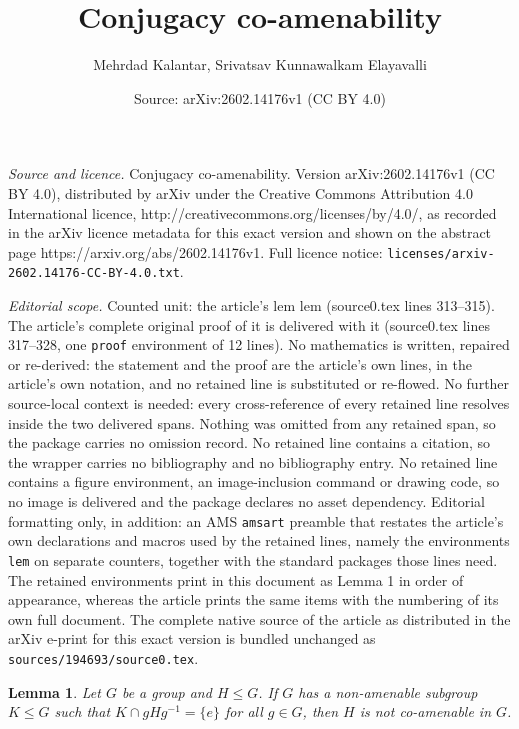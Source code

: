 \documentclass[10pt,a4paper]{amsart}
\title{Conjugacy co-amenability}
\author{Mehrdad Kalantar, Srivatsav Kunnawalkam Elayavalli}
\date{Source: arXiv:2602.14176v1 (CC BY 4.0)}
\newtheorem{lem}{Lemma}
\begin{document}
\maketitle

\noindent\emph{Source and licence.} Conjugacy co-amenability. Version arXiv:2602.14176v1 (CC BY 4.0), distributed by arXiv under the Creative Commons Attribution 4.0 International licence, http://creativecommons.org/licenses/by/4.0/, as recorded in the arXiv licence metadata for this exact version and shown on the abstract page https://arxiv.org/abs/2602.14176v1. Full licence notice: \texttt{licenses/arxiv-2602.14176-CC-BY-4.0.txt}.\par\smallskip

\noindent\textit{Editorial scope.} Counted unit: the article's lem lem (source0.tex lines 313--315). The article's complete original proof of it is delivered with it (source0.tex lines 317--328, one \texttt{proof} environment of 12 lines). No mathematics is written, repaired or re-derived: the statement and the proof are the article's own lines, in the article's own notation, and no retained line is substituted or re-flowed.  No further source-local context is needed: every cross-reference of every retained line resolves inside the two delivered spans.  Nothing was omitted from any retained span, so the package carries no omission record.  No retained line contains a citation, so the wrapper carries no bibliography and no bibliography entry.  No retained line contains a figure environment, an image-inclusion command or drawing code, so no image is delivered and the package declares no asset dependency.  Editorial formatting only, in addition: an AMS \texttt{amsart} preamble that restates the article's own declarations and macros used by the retained lines, namely the environments \texttt{lem} on separate counters, together with the standard packages those lines need.  The retained environments print in this document as Lemma 1 in order of appearance, whereas the article prints the same items with the numbering of its own full document.  The complete native source of the article as distributed in the arXiv e-print for this exact version is bundled unchanged as \texttt{sources/194693/source0.tex}.
\begin{lem}
Let $G$ be a group and $H\le G$. If $G$ has a non-amenable subgroup $K\le G$ such that $K\cap gHg^{-1} = \{e\}$ for all $g\in G$, then $H$ is not co-amenable in $G$.
\end{lem}
\end{document}
